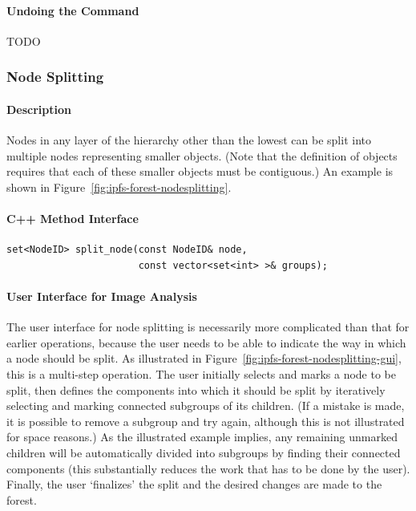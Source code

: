 \paragraph{Undoing the Command}

TODO

\subsubsection{Node Splitting}

\paragraph{Description}

Nodes in any layer of the hierarchy other than the lowest can be split into multiple nodes representing smaller objects. (Note that the definition of objects requires that each of these smaller objects must be contiguous.) An example is shown in Figure~\ref{fig:ipfs-forest-nodesplitting}.

\paragraph{C++ Method Interface}

\begin{lstlisting}[style=Prototype]
set<NodeID> split_node(const NodeID& node,
                       const vector<set<int> >& groups);
\end{lstlisting}

\paragraph{User Interface for Image Analysis}

The user interface for node splitting is necessarily more complicated than that for earlier operations, because the user needs to be able to indicate the way in which a node should be split. As illustrated in Figure~\ref{fig:ipfs-forest-nodesplitting-gui}, this is a multi-step operation. The user initially selects and marks a node to be split, then defines the components into which it should be split by iteratively selecting and marking connected subgroups of its children. (If a mistake is made, it is possible to remove a subgroup and try again, although this is not illustrated for space reasons.) As the illustrated example implies, any remaining unmarked children will be automatically divided into subgroups by finding their connected components (this substantially reduces the work that has to be done by the user). Finally, the user `finalizes' the split and the desired changes are made to the forest.

